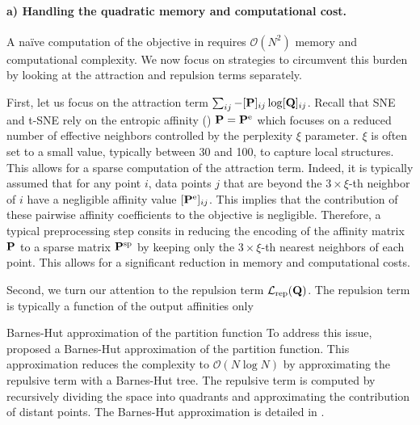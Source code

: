 \paragraph{a) Handling the quadratic memory and computational cost.}

A naïve computation of the objective in  requires $\mathcal{O}(N^2)$ memory and computational complexity. We now focus on strategies to circumvent this burden by looking at the attraction and repulsion terms separately.

First, let us focus on the attraction term $\sum_{ij} -[{\mathbf{P}}]_{ij} \log [{\mathbf{Q}}]_{ij}$. Recall that SNE and t-SNE rely on the entropic affinity () ${\mathbf{P}} = {\mathbf{P}}^{\mathrm{e}}$ which focuses on a reduced number of effective neighbors controlled by the perplexity $\xi$ parameter. $\xi$ is often set to a small value, typically between 30 and 100, to capture local structures. This allows for a sparse computation of the attraction term. Indeed, it is typically assumed that for any point $i$, data points $j$ that are  beyond the $3 \times \xi$-th neighbor of $i$ have a negligible affinity value $[{\mathbf{P}}^{\mathrm{e}}]_{ij}$. This implies that the contribution of these pairwise affinity coefficients to the objective is negligible. Therefore, a typical preprocessing step consits in reducing the encoding of the affinity matrix ${\mathbf{P}}$ to a sparse matrix ${\mathbf{P}}^{\mathrm{sp}}$ by keeping only the $3 \times \xi$-th nearest neighbors of each point. This allows for a significant reduction in memory and computational costs.

Second, we turn our attention to the repulsion term $\mathcal{L}_{\mathrm{rep}}({\mathbf{Q}})$. The repulsion term is typically a function of the output affinities only

\begin{mem1}{Barnes-Hut approximation of the partition function}
    To address this issue, \citet{van2008visualizing} proposed a Barnes-Hut approximation of the partition function. This approximation reduces the complexity to $\mathcal{O}(N \log N)$ by approximating the repulsive term with a Barnes-Hut tree. The repulsive term is computed by recursively dividing the space into quadrants and approximating the contribution of distant points. The Barnes-Hut approximation is detailed in .
\end{mem1}

